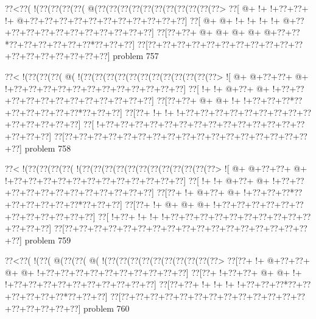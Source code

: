 \vbox{\vbox{\goo
\0??<\0??(\- !(\0??(\0??(\0??(\0??(\- @(\0??(\0??(\0??(\0??(\0??(\0??(\0??(\0??(\0??(\0??(\0??>
\0??[\- @+\- !+\- !+\0??+\0??+\- !+\- @+\0??+\0??+\0??+\0??+\0??+\0??+\0??+\0??+\0??+\0??+\0??]
\0??[\- @+\- @+\- !+\- !+\- !+\- !+\- @+\0??+\0??+\0??+\0??+\0??+\0??+\0??+\0??+\0??+\0??+\0??]
\0??[\0??+\0??+\- @+\- @+\- @+\- @+\- @+\0??+\0??*\0??+\0??+\0??+\0??+\0??+\0??*\0??+\0??+\0??]
\0??[\0??+\0??+\0??+\0??+\0??+\0??+\0??+\0??+\0??+\0??+\0??+\0??+\0??+\0??+\0??+\0??+\0??+\0??]
}
\hfil problem 757\hfil\break
}



\vbox{\vbox{\goo
\0??<\- !(\0??(\0??(\0??(\- @(\- !(\0??(\0??(\0??(\0??(\0??(\0??(\0??(\0??(\0??(\0??(\0??(\0??>
\- ![\- @+\- @+\0??+\0??+\- @+\- !+\0??+\0??+\0??+\0??+\0??+\0??+\0??+\0??+\0??+\0??+\0??+\0??]
\0??[\- !+\- !+\- @+\0??+\- @+\- !+\0??+\0??+\0??+\0??+\0??+\0??+\0??+\0??+\0??+\0??+\0??+\0??]
\0??[\0??+\0??+\- @+\- @+\- !+\- !+\0??+\0??+\0??*\0??+\0??+\0??+\0??+\0??+\0??*\0??+\0??+\0??]
\0??[\0??+\- !+\- !+\- !+\0??+\0??+\0??+\0??+\0??+\0??+\0??+\0??+\0??+\0??+\0??+\0??+\0??+\0??]
\0??[\- !+\0??+\0??+\0??+\0??+\0??+\0??+\0??+\0??+\0??+\0??+\0??+\0??+\0??+\0??+\0??+\0??+\0??]
\0??[\0??+\0??+\0??+\0??+\0??+\0??+\0??+\0??+\0??+\0??+\0??+\0??+\0??+\0??+\0??+\0??+\0??+\0??]
}
\hfil problem 758\hfil\break
}



\vbox{\vbox{\goo
\0??<\- !(\0??(\0??(\0??(\0??(\- !(\0??(\0??(\0??(\0??(\0??(\0??(\0??(\0??(\0??(\0??(\0??(\0??>
\- ![\- @+\- @+\0??+\0??+\- @+\- !+\0??+\0??+\0??+\0??+\0??+\0??+\0??+\0??+\0??+\0??+\0??+\0??]
\0??[\- !+\- !+\- @+\0??+\- @+\- !+\0??+\0??+\0??+\0??+\0??+\0??+\0??+\0??+\0??+\0??+\0??+\0??]
\0??[\0??+\- !+\- @+\0??+\- @+\- !+\0??+\0??+\0??*\0??+\0??+\0??+\0??+\0??+\0??*\0??+\0??+\0??]
\0??[\0??+\- !+\- @+\- @+\- @+\- !+\0??+\0??+\0??+\0??+\0??+\0??+\0??+\0??+\0??+\0??+\0??+\0??]
\0??[\- !+\0??+\- !+\- !+\- !+\0??+\0??+\0??+\0??+\0??+\0??+\0??+\0??+\0??+\0??+\0??+\0??+\0??]
\0??[\0??+\0??+\0??+\0??+\0??+\0??+\0??+\0??+\0??+\0??+\0??+\0??+\0??+\0??+\0??+\0??+\0??+\0??]
}
\hfil problem 759\hfil\break
}



\vbox{\vbox{\goo
\0??<\0??(\- !(\0??(\- @(\0??(\0??(\- @(\- !(\0??(\0??(\0??(\0??(\0??(\0??(\0??(\0??(\0??(\0??>
\0??[\0??+\- !+\- @+\0??+\0??+\- @+\- @+\- !+\0??+\0??+\0??+\0??+\0??+\0??+\0??+\0??+\0??+\0??]
\0??[\0??+\- !+\0??+\0??+\- @+\- @+\- !+\- !+\0??+\0??+\0??+\0??+\0??+\0??+\0??+\0??+\0??+\0??]
\0??[\0??+\0??+\- !+\- !+\- !+\- !+\0??+\0??+\0??*\0??+\0??+\0??+\0??+\0??+\0??*\0??+\0??+\0??]
\0??[\0??+\0??+\0??+\0??+\0??+\0??+\0??+\0??+\0??+\0??+\0??+\0??+\0??+\0??+\0??+\0??+\0??+\0??]
}
\hfil problem 760\hfil\break
}



